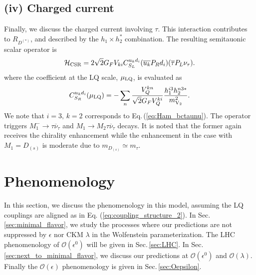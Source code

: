 \documentclass[12pt, a4paper]{article}
\numberwithin{equation}{section} %
\newcommand{\ov}{\overline}
\newcommand{\1}{\mbox{1}\hspace{-0.25em}\mbox{l}}
\begin{document}
\subsection*{(iv) Charged current}
Finally, we discuss the charged current involving $\tau$.
This interaction contributes to $R_{D^{(*)}}$, and described by the $h_1\times h_2^*$ combination.
The resulting semitauonic scalar operator is 
\begin{align}
 {\mathcal H}_{\rm{CSR}}= 
 2 \sqrt 2 G_F V_{ki} C_{S_L}^{u_kd_i}(\overline{u_k} P_R d_i)(\overline{\tau} P_L \nu_{\tau}) .
 \label{Eq:CSL}
\end{align} 
where the coefficient at the LQ scale, $\mu_{\rm LQ}$, is evaluated as
\begin{align}
C_{S_R}^{u_kd_i}(\mu_{\rm{LQ}})=-\sum_{n}\frac{V_Q^{kn}}{\sqrt{2}G_F V_Q^{ki}}\frac{h_1^{i3}h_2^{n3*}}{m_{\rm{V}_2}^2}.
\label{eq:CSR_general}
\end{align}
We note that $i=3,\,k=2$ corresponds to Eq.\,(\ref{eq:Ham_bctaunu}).
The operator triggers $M_1^-\to \tau\ov\nu_\tau$ and $M_1\to M_2 \tau\ov\nu_\tau$ decays.
It is noted that the former again receives the chirality enhancement while the enhancement in the case with $M_1=D_{(s)}$ is moderate due to $m_{D_{(s)}} \simeq m_\tau$.


\section{Phenomenology}
\label{sec:Pheno}
In this section, we discuss the phenomenology in this model, assuming the LQ couplings are aligned as in Eq. (\ref{eq:coupling_structure_2}).
In Sec.\,\ref{sec:minimal_flavor}, we study the processes where 
our predictions are not suppressed by $\epsilon$ nor CKM $\lambda$ in the Wolfenstein parameterization\cite{Wolfenstein:1983yz}.
The LHC phenomenology of $\mathcal{O}(\epsilon^0)$ will be given in Sec.\,\ref{sec:LHC}.
In Sec.\,\ref{sec:next_to_minimal_flavor}, we discuss our predictions at $\mathcal{O}(\epsilon^0)$ and $\mathcal{O}(\lambda)$.
Finally the $\mathcal{O}(\epsilon)$ phenomenology is given in Sec.\,\ref{sec:Oepsilon}.


\end{document}
